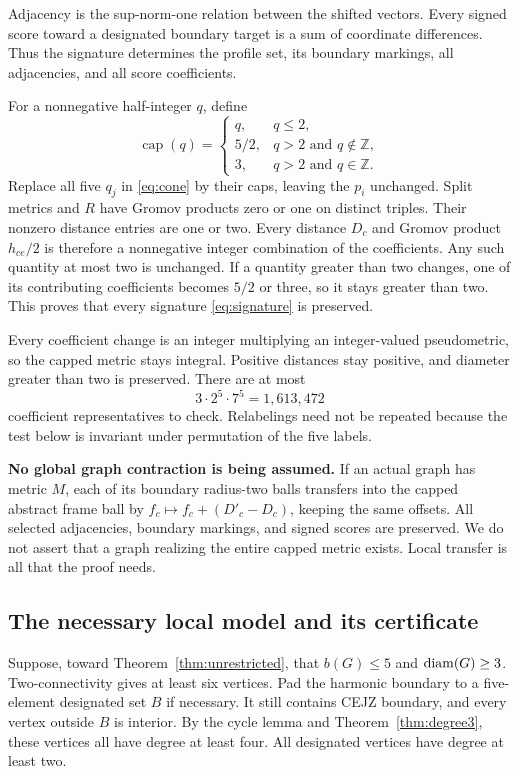 Adjacency is the sup-norm-one relation between the shifted vectors.
Every signed score toward a designated boundary target is a sum of
coordinate differences. Thus the signature determines the profile set,
its boundary markings, all adjacencies, and all score coefficients.

For a nonnegative half-integer $q$, define
\[
 \operatorname{cap}(q)=
 \begin{cases}
 q,&q\le2,\\
 5/2,&q>2\text{ and }q\notin\mathbb Z,\\
 3,&q>2\text{ and }q\in\mathbb Z.
 \end{cases}
\]
Replace all five $q_j$ in \eqref{eq:cone} by their caps, leaving the
$p_i$ unchanged. Split metrics and $R$ have Gromov products zero or one
on distinct triples. Their nonzero distance entries are one or two.
Every distance $D_c$ and Gromov product $h_{ce}/2$ is therefore a
nonnegative integer combination of the coefficients. Any such quantity
at most two is unchanged. If a quantity greater than two changes, one
of its contributing coefficients becomes $5/2$ or three, so it stays
greater than two. This proves that every signature \eqref{eq:signature}
is preserved.

Every coefficient change is an integer multiplying an integer-valued
pseudometric, so the capped metric stays integral. Positive distances
stay positive, and diameter greater than two is preserved.
There are at most
\begin{equation}\label{eq:capcount}
 3\cdot2^5\cdot7^5=1,613,472
\end{equation}
coefficient representatives to check. Relabelings need not be repeated
because the test below is invariant under permutation of the five labels.

\textbf{No global graph contraction is being assumed.}
If an actual graph has metric $M$, each of its boundary radius-two balls
transfers into the capped abstract frame ball by
$f_c\mapsto f_c+(D'_c-D_c)$, keeping the same offsets.
All selected adjacencies, boundary markings, and signed scores are
preserved. We do not assert that a graph realizing the entire capped
metric exists. Local transfer is all that the proof needs.

\subsection{The necessary local model and its certificate}
Suppose, toward Theorem~\ref{thm:unrestricted}, that $b(G)\le5$ and
$\operatorname{diam}(G)\ge3$. Two-connectivity gives at least six vertices. Pad the
harmonic boundary to a five-element designated set $B$ if necessary.
It still contains CEJZ boundary, and every vertex outside $B$ is interior.
By the cycle lemma and Theorem~\ref{thm:degree3}, these vertices all have
degree at least four. All designated vertices have degree at least two.

